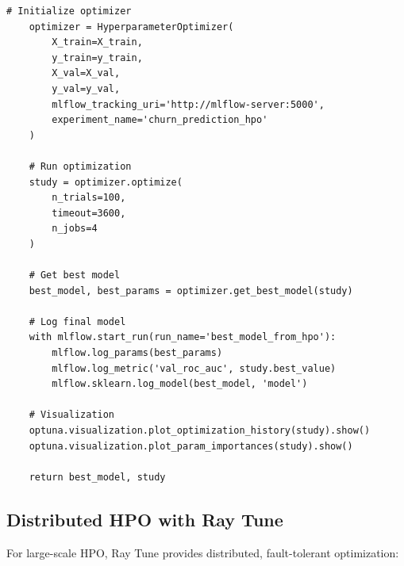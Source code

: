 \begin{lstlisting}[style=python, caption=Hyperparameter Optimization with Optuna]
    # Initialize optimizer
    optimizer = HyperparameterOptimizer(
        X_train=X_train,
        y_train=y_train,
        X_val=X_val,
        y_val=y_val,
        mlflow_tracking_uri='http://mlflow-server:5000',
        experiment_name='churn_prediction_hpo'
    )

    # Run optimization
    study = optimizer.optimize(
        n_trials=100,
        timeout=3600,
        n_jobs=4
    )

    # Get best model
    best_model, best_params = optimizer.get_best_model(study)

    # Log final model
    with mlflow.start_run(run_name='best_model_from_hpo'):
        mlflow.log_params(best_params)
        mlflow.log_metric('val_roc_auc', study.best_value)
        mlflow.sklearn.log_model(best_model, 'model')

    # Visualization
    optuna.visualization.plot_optimization_history(study).show()
    optuna.visualization.plot_param_importances(study).show()

    return best_model, study
\end{lstlisting}

\subsection{Distributed HPO with Ray Tune}

For large-scale HPO, Ray Tune provides distributed, fault-tolerant optimization:

